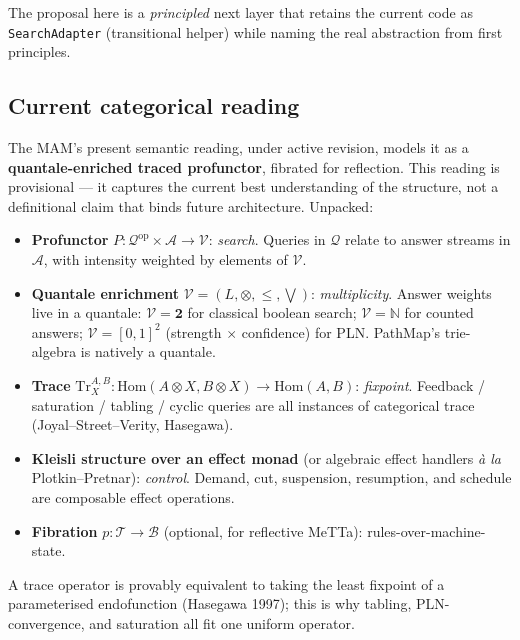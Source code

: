 \documentclass[11pt]{article}
\newcommand{\code}[1]{\texttt{#1}}
\newcommand{\PathMap}{\textup{PathMap}}
\begin{document}
The proposal here is a \emph{principled} next layer that retains the
current code as \code{SearchAdapter} (transitional helper) while
naming the real abstraction from first principles.

\subsection{Current categorical reading}

The MAM's present semantic reading, under active revision, models it
as a \textbf{quantale-enriched traced profunctor}, fibrated for
reflection.  This reading is provisional --- it captures the current
best understanding of the structure, not a definitional claim that
binds future architecture.  Unpacked:

\begin{itemize}
\item \textbf{Profunctor} $P : \mathcal{Q}^{\mathrm{op}} \times
  \mathcal{A} \to \mathcal{V}$: \emph{search}.  Queries in
  $\mathcal{Q}$ relate to answer streams in $\mathcal{A}$, with
  intensity weighted by elements of $\mathcal{V}$.
\item \textbf{Quantale enrichment} $\mathcal{V} = (L, \otimes, \le,
  \bigvee)$: \emph{multiplicity}.  Answer weights live in a quantale:
  $\mathcal{V} = \mathbf{2}$ for classical boolean search;
  $\mathcal{V} = \mathbb{N}$ for counted answers;
  $\mathcal{V} = [0,1]^2$ (strength $\times$ confidence) for PLN.
  \PathMap{}'s trie-algebra is natively a quantale.
\item \textbf{Trace} $\mathrm{Tr}_X^{A,B} : \mathrm{Hom}(A \otimes X, B
  \otimes X) \to \mathrm{Hom}(A, B)$: \emph{fixpoint}.  Feedback /
  saturation / tabling / cyclic queries are all instances of
  categorical trace (Joyal--Street--Verity, Hasegawa).
\item \textbf{Kleisli structure over an effect monad} (or algebraic
  effect handlers \emph{\`a la} Plotkin--Pretnar): \emph{control}.
  Demand, cut, suspension, resumption, and schedule are composable
  effect operations.
\item \textbf{Fibration} $p : \mathcal{T} \to \mathcal{B}$ (optional,
  for reflective MeTTa): rules-over-machine-state.
\end{itemize}

A trace operator is provably equivalent to taking the least fixpoint
of a parameterised endofunction (Hasegawa 1997); this is why tabling,
PLN-convergence, and saturation all fit one uniform operator.
\end{document}

